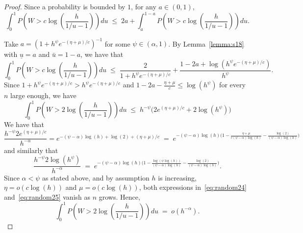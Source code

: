 \documentclass[
  12pt]{article}
\newtheorem{lem}[thm]{\textsc{Lemma}}
\begin{document}
\begin{proof}
Since a probability is bounded by $1$, for any $a\in(0,1)$,
\begin{equation}\label{eq:basebound}
    \int_0^1 P\left(W>c \log \left(\frac{h}{1 / u-1}\right)\right) d u \;\leq\; 2 a+\int_{a}^{1-a} P\left(W>c\log\left(\frac{h}{1 / u-1}\right)\right) d u.
\end{equation}

Take $a=\left(1+h^{\psi}e^{-(\eta+\mu)/ c}\right)^{-1}$ for some $\psi\in(\alpha,1)$. By Lemma~\ref{lemma:s18} with $\underline{u}=a$ and $\bar{u}=1-a$, we have that
$$
\int_0^1 P\left(W>c \log \left(\frac{h}{1 / u-1}\right)\right) d u \;\leq\; \frac{2}{1+h^{\psi}e^{-(\eta+\mu)/c}}+ 
\frac{1-2a+\log(h^{\psi}e^{-(\eta+\mu)/c})}{h^{\psi}}. $$
Since $1+h^{\psi}e^{-(\eta+\mu)/ c}>h^{\psi}e^{-(\eta+\mu)/ c}$ and $1-2a-\frac{\eta+\mu}{c}\leq \log(h^\psi)$ for every $n$ large enough, we have
$$
\int_0^1 P\left(W>2 \log \left(\frac{h}{1 / u-1}\right)\right) d u \;\leq\; h^{-\psi}\big(2e^{(\eta+\mu)/ c}+2\log(h^{\psi})\big) $$
We have that
\begin{equation}\label{eq:random24}
    \frac{h^{-\psi}2e^{(\eta+\mu)/ c}}{h^{-\alpha}} 
= e^{-(\psi-\alpha) \log(h) + \log(2) + (\eta + \mu)/c}
    \;=\;e^{-(\psi-\alpha)\log(h)\big(1-\frac{\eta+\mu}{c(\psi-\alpha)\log(h)}- \frac{\log(2)}{(\psi-\alpha)\log(h)}\big)}
\end{equation}
and similarly that
\begin{equation}\label{eq:random25}
    \frac{h^{-\psi}2\log(h^{\psi})}{h^{-\alpha}} \;=\;e^{-(\psi-\alpha)\log(h)\big(1-\frac{\log(\psi\log(h))}{(\psi-\alpha)\log(h)}- \frac{\log(2)}{(\psi-\alpha)\log(h)}\big)}.
\end{equation}
Since $\alpha<\psi$ as stated above, and by assumption $h$ is increasing, $\eta=o(c\log(h))$ and $\mu=o(c\log(h))$, both expressions in~\eqref{eq:random24} and~\eqref{eq:random25} vanish as $n$ grows. Hence, 
$$\int_0^1 P\left(W>2 \log \left(\frac{h}{1 / u-1}\right)\right) d u \;=\; o(h^{-\alpha}).$$
\end{proof}


\end{document}
